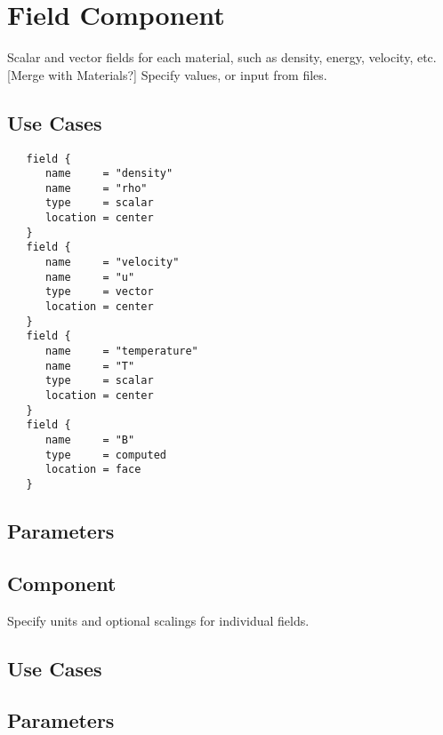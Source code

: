 \section{Field Component} \label{s:component-field}

Scalar and vector fields for each material, such as
 density, energy, velocity, etc.  [Merge with Materials?]  Specify
 values, or input from files.

\subsection{Use Cases}
\begin{verbatim}
   field {
      name     = "density"
      name     = "rho"
      type     = scalar
      location = center
   }
   field {
      name     = "velocity"
      name     = "u"
      type     = vector
      location = center
   }
   field {
      name     = "temperature"
      name     = "T"
      type     = scalar
      location = center
   }
   field {
      name     = "B"
      type     = computed
      location = face
   }
\end{verbatim}
\subsection{Parameters}

\subsection{ Component} \label{s:component-units}

 Specify units and optional scalings for individual
 fields.  

\subsection{Use Cases}
\subsection{Parameters}
